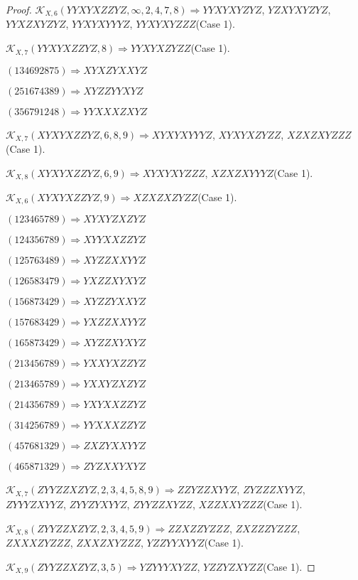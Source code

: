 \documentclass[12pt]{article}
\theoremstyle{plain}
\theoremstyle{definition}
\theoremstyle{remark}
\newcommand{\fancy}[1]{\mathcal{#1}}
\def\K{\fancy{K}}
\begin{document}
\begin{proof}
	$\K_{X,6}(YYXYXZZYZ,\infty,2, 4, 7, 8)\Rightarrow $$YYXYXYZYZ$, $YZXYXYZYZ$, $YYXZXYZYZ$, $YYXYXYYYZ$, $YYXYXYZZZ$(Case 1).
	
	$\K_{X,7}(YYXYXZZYZ,8)\Rightarrow $$YYXYXZYZZ$(Case 1).
	
	
	
	$(1 3 4 6 9 2 8 7 5)\Rightarrow XYXZYXXYZ$
	
	$(2 5 1 6 7 4 3 8 9)\Rightarrow XYZZYYXYZ$
	
	$(3 5 6 7 9 1 2 4 8)\Rightarrow YYXXXZXYZ$
	
	
	
	$\K_{X,7}(XYXYXZZYZ,6, 8, 9)\Rightarrow $$XYXYXYYYZ$, $XYXYXZYZZ$, $XZXZXYZZZ$(Case 1).
	
	$\K_{X,8}(XYXYXZZYZ,6, 9)\Rightarrow $$XYXYXYZZZ$, $XZXZXYYYZ$(Case 1).
	
	$\K_{X,6}(XYXYXZZYZ,9)\Rightarrow $$XZXZXZYZZ$(Case 1).
	
	
	
	$(1 2 3 4 6 5 7 8 9)\Rightarrow XYXYZXZYZ$
	
	$(1 2 4 3 5 6 7 8 9)\Rightarrow XYYXXZZYZ$
	
	$(1 2 5 7 6 3 4 8 9)\Rightarrow XYZZXXYYZ$
	
	$(1 2 6 5 8 3 4 7 9)\Rightarrow YXZZXYXYZ$
	
	$(1 5 6 8 7 3 4 2 9)\Rightarrow XYZZYXXYZ$
	
	$(1 5 7 6 8 3 4 2 9)\Rightarrow YXZZXXYYZ$
	
	$(1 6 5 8 7 3 4 2 9)\Rightarrow XYZZXYXYZ$
	
	$(2 1 3 4 5 6 7 8 9)\Rightarrow YXXYXZZYZ$
	
	$(2 1 3 4 6 5 7 8 9)\Rightarrow YXXYZXZYZ$
	
	$(2 1 4 3 5 6 7 8 9)\Rightarrow YXYXXZZYZ$
	
	$(3 1 4 2 5 6 7 8 9)\Rightarrow YYXXXZZYZ$
	
	$(4 5 7 6 8 1 3 2 9)\Rightarrow ZXZYXXYYZ$
	
	$(4 6 5 8 7 1 3 2 9)\Rightarrow ZYZXXYXYZ$
	
	
	
	$\K_{X,7}(ZYYZZXZYZ,2, 3, 4, 5, 8, 9)\Rightarrow $$ZZYZZXYYZ$, $ZYZZZXYYZ$, $ZYYYZXYYZ$, $ZYYZYXYYZ$, $ZYYZZXYZZ$, $XZZXXYZZZ$(Case 1).
	
	$\K_{X,8}(ZYYZZXZYZ,2, 3, 4, 5, 9)\Rightarrow $$ZZXZZYZZZ$, $ZXZZZYZZZ$, $ZXXXZYZZZ$, $ZXXZXYZZZ$, $YZZYYXYYZ$(Case 1).
	
	$\K_{X,9}(ZYYZZXZYZ,3, 5)\Rightarrow $$YZYYYXYZZ$, $YZZYZXYZZ$(Case 1).
	

\end{proof}
\end{document}
